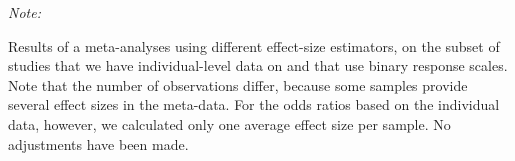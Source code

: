 \documentclass[
  man]{apa6}
\begin{document}
\begin{table}
\centering\centering
\caption{\label{tab:meta-odds}Individual-level studies with binary response scale}
\centering
\begin{threeparttable}
\begin{tablenotes}
\item \textit{Note: } 
\item Results of a meta-analyses using different effect-size estimators, on the subset of studies that we have individual-level data on and that use binary response scales.  Note that the number of observations differ, because some samples provide several effect sizes in the meta-data. For the odds ratios based on the individual data, however, we calculated only one average effect size per sample. No adjustments have been made.
\end{tablenotes}
\end{threeparttable}
\end{table}
\end{document}
